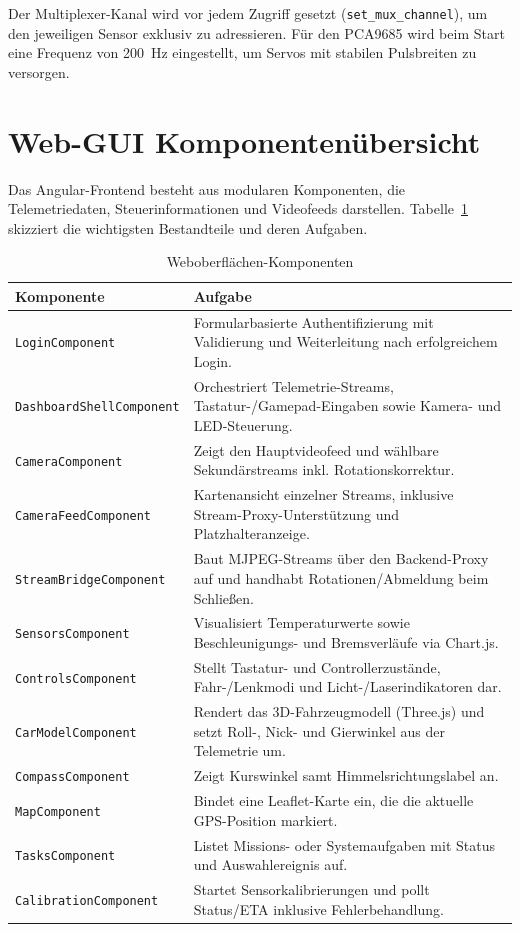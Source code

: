 \documentclass[a4paper,11pt]{article}
\begin{document}
Der Multiplexer-Kanal wird vor jedem Zugriff gesetzt (\texttt{set\_mux\_channel}), um den
jeweiligen Sensor exklusiv zu adressieren. Für den PCA9685 wird beim Start eine
Frequenz von 200~Hz eingestellt, um Servos mit stabilen Pulsbreiten zu versorgen.

\section{Web-GUI Komponentenübersicht}
Das Angular-Frontend besteht aus modularen Komponenten, die Telemetriedaten,
Steuerinformationen und Videofeeds darstellen. Tabelle~\ref{tab:webui} skizziert die wichtigsten
Bestandteile und deren Aufgaben.

\begin{longtable}{p{4cm}p{9cm}}
\caption{Weboberflächen-Komponenten}\label{tab:webui}\\
\textbf{Komponente} & \textbf{Aufgabe}\\\hline
\texttt{LoginComponent} & Formularbasierte Authentifizierung mit Validierung und Weiterleitung nach erfolgreichem Login.\\
\texttt{DashboardShellComponent} & Orchestriert Telemetrie-Streams, Tastatur-/Gamepad-Eingaben sowie Kamera- und LED-Steuerung.\\
\texttt{CameraComponent} & Zeigt den Hauptvideofeed und wählbare Sekundärstreams inkl. Rotationskorrektur.\\
\texttt{CameraFeedComponent} & Kartenansicht einzelner Streams, inklusive Stream-Proxy-Unterstützung und Platzhalteranzeige.\\
\texttt{StreamBridgeComponent} & Baut MJPEG-Streams über den Backend-Proxy auf und handhabt Rotationen/Abmeldung beim Schließen.\\
\texttt{SensorsComponent} & Visualisiert Temperaturwerte sowie Beschleunigungs- und Bremsverläufe via Chart.js.\\
\texttt{ControlsComponent} & Stellt Tastatur- und Controllerzustände, Fahr-/Lenkmodi und Licht-/Laserindikatoren dar.\\
\texttt{CarModelComponent} & Rendert das 3D-Fahrzeugmodell (Three.js) und setzt Roll-, Nick- und Gierwinkel aus der Telemetrie um.\\
\texttt{CompassComponent} & Zeigt Kurswinkel samt Himmelsrichtungslabel an.\\
\texttt{MapComponent} & Bindet eine Leaflet-Karte ein, die die aktuelle GPS-Position markiert.\\
\texttt{TasksComponent} & Listet Missions- oder Systemaufgaben mit Status und Auswahlereignis auf.\\
\texttt{CalibrationComponent} & Startet Sensorkalibrierungen und pollt Status/ETA inklusive Fehlerbehandlung.\\
\end{longtable}
\end{document}
